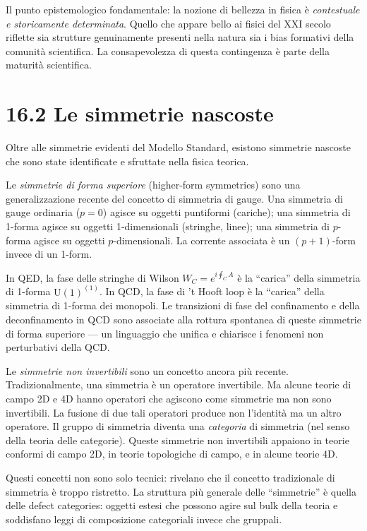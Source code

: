 \documentclass[11.5pt,a4paper,openany]{book}
\theoremstyle{remark}
\begin{document}
Il punto epistemologico fondamentale: la nozione di bellezza in fisica è \textit{contestuale e storicamente determinata}. Quello che appare bello ai fisici del XXI secolo riflette sia strutture genuinamente presenti nella natura sia i bias formativi della comunità scientifica. La consapevolezza di questa contingenza è parte della maturità scientifica.

\section{16.2 Le simmetrie nascoste}

Oltre alle simmetrie evidenti del Modello Standard, esistono simmetrie nascoste che sono state identificate e sfruttate nella fisica teorica.

Le \textit{simmetrie di forma superiore} (higher-form symmetries) sono una generalizzazione recente del concetto di simmetria di gauge. Una simmetria di gauge ordinaria ($p=0$) agisce su oggetti puntiformi (cariche); una simmetria di 1-forma agisce su oggetti 1-dimensionali (stringhe, linee); una simmetria di $p$-forma agisce su oggetti $p$-dimensionali. La corrente associata è un $(p+1)$-form invece di un 1-form.

In QED, la fase delle stringhe di Wilson $W_C = e^{i \oint_C A}$ è la ``carica'' della simmetria di 1-forma $\mathrm{U}(1)^{(1)}$. In QCD, la fase di 't Hooft loop è la ``carica'' della simmetria di 1-forma dei monopoli. Le transizioni di fase del confinamento e della deconfinamento in QCD sono associate alla rottura spontanea di queste simmetrie di forma superiore --- un linguaggio che unifica e chiarisce i fenomeni non perturbativi della QCD.

Le \textit{simmetrie non invertibili} sono un concetto ancora più recente. Tradizionalmente, una simmetria è un operatore invertibile. Ma alcune teorie di campo 2D e 4D hanno operatori che agiscono come simmetrie ma non sono invertibili. La fusione di due tali operatori produce non l'identità ma un altro operatore. Il gruppo di simmetria diventa una \textit{categoria} di simmetria (nel senso della teoria delle categorie). Queste simmetrie non invertibili appaiono in teorie conformi di campo 2D, in teorie topologiche di campo, e in alcune teorie 4D.

Questi concetti non sono solo tecnici: rivelano che il concetto tradizionale di simmetria è troppo ristretto. La struttura più generale delle ``simmetrie'' è quella delle defect categories: oggetti estesi che possono agire sul bulk della teoria e soddisfano leggi di composizione categoriali invece che gruppali.
\end{document}
